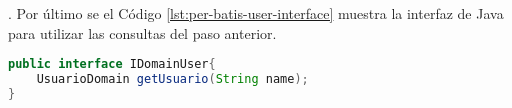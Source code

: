 . Por último se el Código \ref{lst:per-batis-user-interface} muestra la interfaz de Java para utilizar las consultas del paso anterior.
\begin{lstlisting}[language=Java, caption={Interfaz de Java para la fábrica de MyBatis.}, captionpos=b, label={lst:per-batis-user-interface}]
public interface IDomainUser{
	UsuarioDomain getUsuario(String name);
}
\end{lstlisting}
